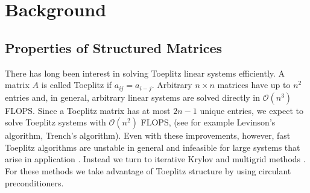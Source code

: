 \documentclass[review]{siamart251216}
\newcommand{\bigOh}{\mathcal{O}}
\begin{document}



\section{Background}
\subsection{Properties of Structured Matrices} \label{sec:matrix_props}
There has long been interest in solving Toeplitz linear systems efficiently. A matrix $A$ is called Toeplitz if $a_{ij} = a_{i-j}$. Arbitrary $n \times n$ matrices have up to $n^2$ entries and, in general, arbitrary linear systems are solved directly in $\bigOh(n^3)$ FLOPS. Since a Toeplitz matrix has at most $2n-1$ unique entries, we expect to solve Toeplitz systems with $\bigOh (n^2)$ FLOPS, (see for example Levinson's algorithm, Trench's algorithm). Even with these improvements, however, fast Toeplitz algorithms are unstable in general and infeasible for large systems that arise in application \cite{stable}. Instead we turn to iterative Krylov and multigrid methods \cite{schrod, hierarch, Xiaozhe}. For these methods we take advantage of Toeplitz structure by using circulant preconditioners. 
\end{document}
